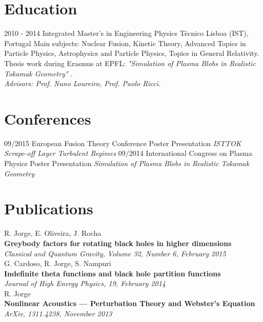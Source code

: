\documentclass[]{friggeri-cv}
\begin{document}
\section{Education}
\begin{entrylist}
  \entry
    {2010 - 2014}
    {Integrated Master's in Engineering Physics}
    {Técnico Lisboa (IST), Portugal}
    {Main subjects: Nuclear Fusion, Kinetic Theory, Advanced Topics in Particle Physics, Astrophysics and Particle Physics, Topics in General Relativity.\\
    Thesis work during Erasmus at EPFL: \emph{"Simulation of Plasma Blobs in Realistic Tokamak Geometry"      .}\\
    \emph{Advisors: Prof. Nuno Loureiro, Prof. Paolo Ricci.}\\}
\end{entrylist}

\section{Conferences}
\begin{entrylist}
  \entry
    {09/2015}
    {European Fusion Theory Conference}
    {Poster Presentation}
    {\emph{ISTTOK Scrape-off Layer Turbulent Regimes}}
  \entry
    {09/2014}
    {International Congress on Plasma Physics}
    {Poster Presentation}
    {\emph{Simulation of Plasma Blobs in Realistic Tokamak Geometry}}
\end{entrylist}


\section{Publications}
R. Jorge, E. Oliveira, J. Rocha\\
\textbf{Greybody factors for rotating black holes in higher dimensions}\\
\emph{Classical and Quantum Gravity, Volume 32, Number 6, February 2015}
\\
G. Cardoso, R. Jorge, S. Nampuri\\
\textbf{Indefinite theta functions and black hole partition functions}\\
\emph{Journal of High Energy Physics, 19, February 2014}
\\
R. Jorge\\
\textbf{Nonlinear Acoustics — Perturbation Theory and Webster’s Equation}\\
\emph{ArXiv, 1311.4238, November 2013}
\end{document}

